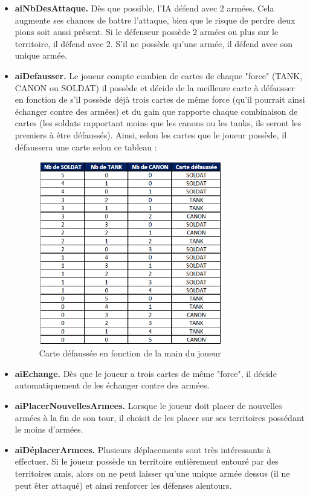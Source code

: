 \begin{itemize}
    \item \textbf{aiNbDesAttaque.}
    Dès que possible, l'IA défend avec 2 armées. Cela augmente ses chances de battre l'attaque, bien que le risque de perdre deux pions soit aussi présent. 
    Si le défenseur possède 2 armées ou plus sur le territoire, il défend avec 2. S'il ne possède qu'une armée, il défend avec son unique armée.
    \newline
    
    \item \textbf{aiDefausser.}
    Le joueur compte combien de cartes de chaque "force" (TANK, CANON ou SOLDAT) il possède et décide de la meilleure carte à défausser en fonction de s'il possède déjà trois cartes de même force (qu'il pourrait ainsi échanger contre des armées) et du gain que rapporte chaque combinaison de cartes (les soldats rapportant moins que les canons ou les tanks, ils seront les premiers à être défaussés). Ainsi, selon les cartes que le joueur possède, il défaussera une carte selon ce tableau :
    \begin{figure}[!htbp]
        \centering
        \includegraphics[width=8cm]{Images/defausse.png}
        \caption{Carte défaussée en fonction de la main du joueur}
        \label{fig:defausse}
    \end{figure}
    
    \item \textbf{aiEchange.}
    Dès que le joueur a trois cartes de même "force", il décide automatiquement de les échanger contre des armées.
    
    \item \textbf{aiPlacerNouvellesArmees.}
    Lorsque le joueur doit placer de nouvelles armées à la fin de son tour, il choisit de les placer sur ses territoires possédant le moins d'armées.
    \newline
    
    \item \textbf{aiDéplacerArmees.}
    Plusieurs déplacements sont très intéressants à effectuer. Si le joueur possède un territoire entièrement entouré par des territoires amis, alors on ne peut laisser qu'une unique armée dessus (il ne peut êter attaqué) et ainsi renforcer les défenses alentours. 
    \newline
    
\end{itemize}

